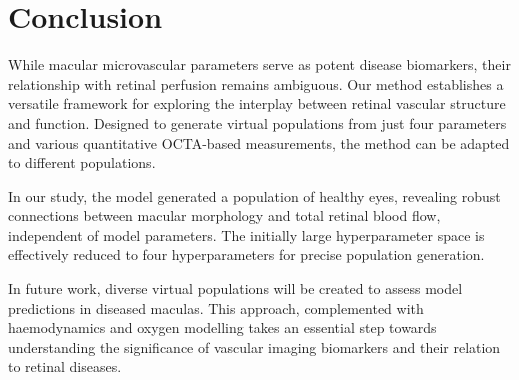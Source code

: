 \documentclass[11pt,]{article}
\begin{document}
\section{Conclusion}\label{sec:conclusion}

While macular microvascular parameters serve as potent disease biomarkers, their relationship with retinal perfusion remains ambiguous.
Our method establishes a versatile framework for exploring the interplay between retinal vascular structure and function.
Designed to generate virtual populations from just four parameters and various quantitative OCTA-based measurements, the method can be adapted to different populations.

In our study, the model generated a population of healthy eyes, revealing robust connections between macular morphology and total retinal blood flow, independent of model parameters.
The initially large hyperparameter space is effectively reduced to four hyperparameters for precise population generation.

In future work, diverse virtual populations will be created to assess model predictions in diseased maculas.
This approach, complemented with haemodynamics and oxygen modelling takes an essential step towards understanding the significance of vascular imaging biomarkers and their relation to retinal diseases.


\end{document}
